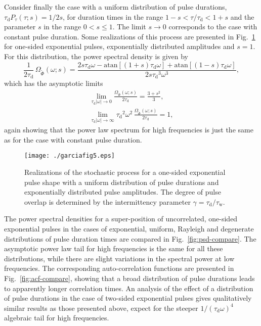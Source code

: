 \documentclass[aps,prb,12pt,a4paper,preprint,amsmath,amssymb,groupedaddress]{revtex4-1}
\newcommand{\abs}[1]{{\left|#1\right|}}\newcommand{\order}[1]{{\mathcal{O}\left(#1\right)}}
\newcommand{\taud}{\ensuremath{\tau_\text{d}}}
\newcommand{\tauw}{\ensuremath{\tau_\text{w}}}
\newcommand{\Phiwt}{\ensuremath{\widetilde{\Phi}}}
\newcommand{\Figref}[1]{Fig.~\ref{#1}}
\begin{document}
Consider finally the case with a uniform distribution of pulse durations, $\taud P_\tau(\tau;s)=1/2s$, for duration times in the range $1-s<\tau/\taud<1+s$ and the parameter $s$ in the range $0<s\leq1$. The limit $s\rightarrow0$ corresponds to the case with constant pulse duration. Some realizations of this process are presented in \Figref{fig:Phiraw-unif} for one-sided exponential pulses, exponentially distributed amplitudes and $s=1$. For this distribution, the power spectral density is given by
\begin{equation}
\frac{1}{2\taud}\,\Omega_{\Phiwt}(\omega;s) = \frac{2s\taud\omega - \text{atan}[(1+s)\taud\omega]+\text{atan}[(1-s)\taud\omega]}{2s\taud^3\omega^3} ,
\end{equation}
which has the asymptotic limits
\begin{gather}
\lim_{\taud\abs{\omega}\rightarrow0} \frac{\Omega_{\Phiwt}(\omega;s)}{2\taud} = \frac{3+s^2}{3} ,
\\
\lim_{\taud\abs{\omega}\rightarrow\infty} \taud^2\omega^2\,\frac{\Omega_{\Phiwt}(\omega;s)}{2\taud} = 1 ,
\end{gather}
again showing that the power law spectrum for high frequencies is just the same as for the case with constant pulse duration.


\begin{figure}
\texttt{[image: ./garciafig5.eps]}
\caption{Realizations of the stochastic process for a one-sided exponential pulse shape with a uniform distribution of pulse durations and exponentially distributed pulse amplitudes. The degree of pulse overlap is determined by the intermittency parameter $\gamma=\taud/\tauw$.}
\label{fig:Phiraw-unif}
\end{figure}


The power spectral densities for a super-position of uncorrelated, one-sided exponential pulses in the cases of exponential, uniform, Rayleigh and degenerate distributions of pulse duration times are compared in \Figref{fig:psd-compare}. The asymptotic power law tail for high frequencies is the same for all these distributions, while there are slight variations in the spectral power at low frequencies. The corresponding auto-correlation functions are presented in \Figref{fig:acf-compare}, showing that a broad distribution of pulse durations leads to apparently longer correlation times. An analysis of the effect of a distribution of pulse durations in the case of two-sided exponential pulses gives qualitatively similar results as those presented above, expect for the steeper $1/(\taud\omega)^4$ algebraic tail for high frequencies.
\end{document}

